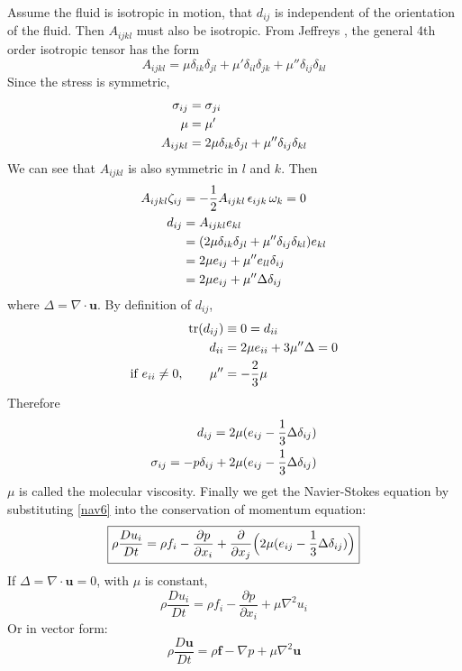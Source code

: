 \newslide
Assume the fluid is isotropic in motion, that $d_{ij}$ is
independent of the orientation of the fluid. Then $A_{ijkl}$ must
also be isotropic. From Jeffreys \cite[p.70]{Tensor}, the general
4th order isotropic tensor has the form
\begin{equation}\label{nav5}
    A_{ijkl}=\mu\delta_{ik}\delta_{jl}+\mu'\delta_{il}\delta_{jk}+\mu''\delta_{ij}\delta_{kl}
\end{equation}
Since the stress is symmetric,
\begin{align}
    \sigma_{ij}&=\sigma_{ji}\notag\\
    \mu&=\mu'\notag\\
    A_{ijkl}&=2\mu\delta_{ik}\delta_{jl}+\mu''\delta_{ij}\delta_{kl}
\end{align}
\newslide
We can see that $A_{ijkl}$ is also symmetric in $l$ and $k$. Then
\begin{align}
    A_{ijkl}\zeta_{ij}&=-\frac{1}{2}A_{ijkl}\,\epsilon_{ijk}\,\omega_k=0\notag\\
    d_{ij}&=A_{ijkl}e_{kl}\notag\\
    &=(2\mu\delta_{ik}\delta_{jl}+\mu''\delta_{ij}\delta_{kl})e_{kl}\notag\\
    &=2\mu e_{ij}+\mu''e_{ll}\delta_{ij}\notag\\
    &=2\mu e_{ij}+\mu''\Delta\delta_{ij}
\end{align}
where $\Delta=\nabla\cdot\mathbf{u}$.
\newslide
By definition of $d_{ij}$,
\begin{align}
    \text{tr}(d_{ij})&\equiv 0 = d_{ii}\notag\\
    d_{ii}&=2\mu e_{ii}+3\mu''\Delta=0\notag\\
    \text{if $e_{ii}\neq 0$},\qquad \mu''&=-\frac{2}{3}\mu
\end{align}
Therefore
\begin{align}
    d_{ij}=2\mu(e_{ij}-\frac{1}{3}\Delta\delta_{ij})\notag\\
    \sigma_{ij}=-p\delta_{ij}+2\mu(e_{ij}-\frac{1}{3}\Delta\delta_{ij})\label{nav6}
\end{align}
$\mu$ is called the molecular viscosity.
\newslide
Finally we get the Navier-Stokes equation by substituting
\eqref{nav6} into the conservation of momentum equation:
\begin{equation}\label{nav:eq}
    \boxed{\rho\frac{D u_i}{D t} = \rho f_i - \frac{\partial p}{\partial
    x_i}+\frac{\partial}{\partial x_j}\Bigl(2\mu(e_{ij}-\frac{1}{3}\Delta\delta_{ij})\Bigr)}
\end{equation}
If $\Delta=\nabla\cdot\mathbf{u}=0$, with $\mu$ is constant,
\begin{equation}\label{nav:eq2}
    \rho\frac{D u_i}{D t} = \rho f_i - \frac{\partial p}{\partial
    x_i}+\mu\nabla^2 u_i
\end{equation}
Or in vector form:
\begin{equation}\label{nav:eq3}
    \rho\frac{D \mathbf{u}}{D t} = \rho \mathbf{f} - \nabla p + \mu\nabla^2 \mathbf{u}
\end{equation}
